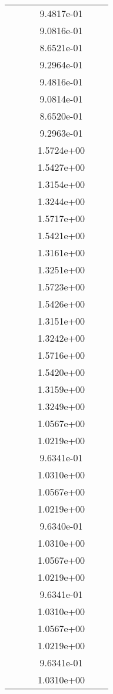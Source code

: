 \begin{xltabular}{\textwidth}{r|rS[table-format=1.3e+2]S[table-format=1.4e+2]S[table-format=1.4e+2]S[table-format=-1.5]}
&  &  & 9.4817e-01 & & \\
&  &  & 9.0816e-01 & & \\
&  &  & 8.6521e-01 & & \\
&  &  & 9.2964e-01 & & \\
&  &  & 9.4816e-01 & & \\
&  &  & 9.0814e-01 & & \\
&  &  & 8.6520e-01 & & \\
&  &  & 9.2963e-01 & & \\
&  &  & 1.5724e+00 & & \\
&  &  & 1.5427e+00 & & \\
&  &  & 1.3154e+00 & & \\
&  &  & 1.3244e+00 & & \\
&  &  & 1.5717e+00 & & \\
&  &  & 1.5421e+00 & & \\
&  &  & 1.3161e+00 & & \\
&  &  & 1.3251e+00 & & \\
&  &  & 1.5723e+00 & & \\
&  &  & 1.5426e+00 & & \\
&  &  & 1.3151e+00 & & \\
&  &  & 1.3242e+00 & & \\
&  &  & 1.5716e+00 & & \\
&  &  & 1.5420e+00 & & \\
&  &  & 1.3159e+00 & & \\
&  &  & 1.3249e+00 & & \\
&  &  & 1.0567e+00 & & \\
&  &  & 1.0219e+00 & & \\
&  &  & 9.6341e-01 & & \\
&  &  & 1.0310e+00 & & \\
&  &  & 1.0567e+00 & & \\
&  &  & 1.0219e+00 & & \\
&  &  & 9.6340e-01 & & \\
&  &  & 1.0310e+00 & & \\
&  &  & 1.0567e+00 & & \\
&  &  & 1.0219e+00 & & \\
&  &  & 9.6341e-01 & & \\
&  &  & 1.0310e+00 & & \\
&  &  & 1.0567e+00 & & \\
&  &  & 1.0219e+00 & & \\
&  &  & 9.6341e-01 & & \\
&  &  & 1.0310e+00 & & \\

\end{xltabular}
